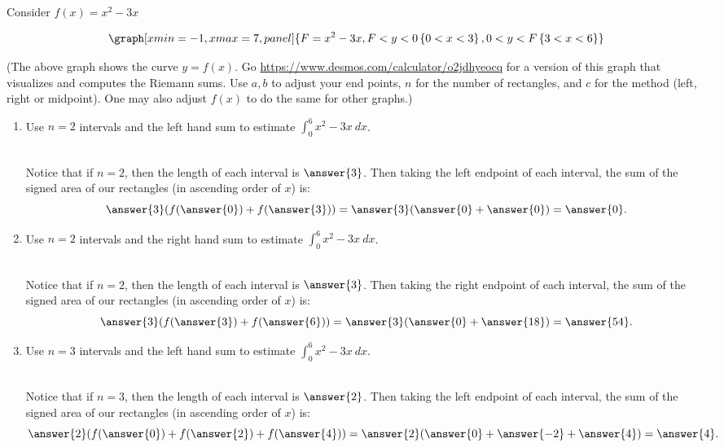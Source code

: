 \documentclass{ximera}
\begin{document}
\begin{question}
Consider $f(x)=x^2-3x$

\begin{onlineOnly}
$$\graph[xmin=-1, xmax=7, panel]{F=x^2-3x, F<y<0\left\{0<x<3\right\},0<y<F\left\{3<x<6\right\}}$$
\end{onlineOnly}
(The above graph shows the curve $y=f(x)$. Go  \url{https://www.desmos.com/calculator/o2jdhyeocq} for a version of this graph that visualizes and computes  the Riemann sums.  Use $a, b$ to adjust your end points, $n$ for the number of rectangles, and $c$ for the method (left, right or midpoint).  One may also adjust $f(x)$ to do the same for other graphs.)


\begin{enumerate}
\item Use $n=2$ intervals and the left hand sum to estimate $\displaystyle\int_0^6 x^2-3x\ dx$. \\ \\
\begin{explanation}
Notice that if $n=2$, then the length of each interval is $\answer{3}$.  Then taking the left endpoint of each interval, the sum of the signed area of our rectangles (in ascending order of $x$) is: $$\answer{3}(f(\answer{0})+f(\answer{3}))=\answer{3}(\answer{0}+\answer{0})=\answer{0}.$$
\end{explanation}

\item Use $n=2$ intervals and the right hand sum to estimate $\displaystyle\int_0^6 x^2-3x\ dx$. \\ \\
\begin{explanation}
Notice that if $n=2$, then the length of each interval is $\answer{3}$.  Then taking the right endpoint of each interval, the sum of the signed area of our rectangles (in ascending order of $x$) is: $$\answer{3}(f(\answer{3})+f(\answer{6}))=\answer{3}(\answer{0}+\answer{18})=\answer{54}.$$

\end{explanation}

\item Use $n=3$ intervals and the left hand sum to estimate $\displaystyle\int_0^6 x^2-3x\ dx$. \\ \\
\begin{explanation}
Notice that if $n=3$, then the length of each interval is $\answer{2}$.  Then taking the left endpoint of each interval, the sum of the signed area of our rectangles (in ascending order of $x$) is: $$\answer{2}(f(\answer{0})+f(\answer{2})+f(\answer{4}))=\answer{2}(\answer{0}+\answer{-2}+\answer{4})=\answer{4}.$$


\end{explanation}
\end{enumerate}
\end{question}
\end{document}
